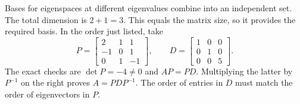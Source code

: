 Bases for eigenspaces at different eigenvalues combine into an independent set. The total dimension is $2+1=3$.
This equals the matrix size, so it provides the required basis. In the order just listed, take
\[P=\begin{bmatrix}2&1&1\\-1&0&1\\0&1&-1\end{bmatrix},\qquad D=\begin{bmatrix}1&0&0\\0&1&0\\0&0&5\end{bmatrix}.\]
The exact checks are $\det P=-4\ne0$ and $AP=PD$. Multiplying the latter by $P^{-1}$ on the right proves $A=PDP^{-1}$. The order of entries in $D$ must match the order of eigenvectors in $P$.



